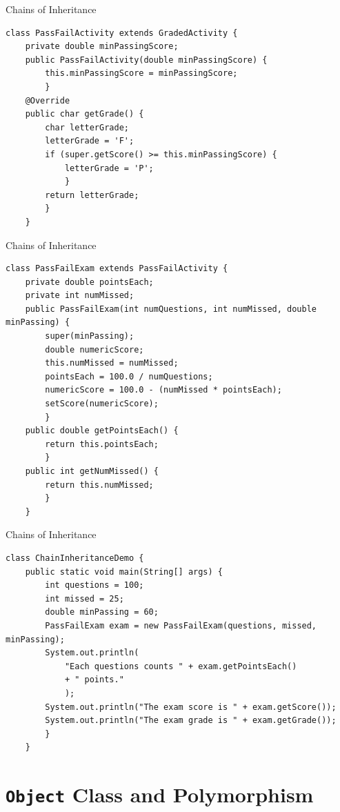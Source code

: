 \documentclass[11pt]{beamer}
\begin{document}
\begin{frame}[fragile]{Chains of Inheritance}
    \begin{lstlisting}[basicstyle=\ttfamily\footnotesize]
class PassFailActivity extends GradedActivity {
    private double minPassingScore;
    public PassFailActivity(double minPassingScore) {
        this.minPassingScore = minPassingScore;
        }
    @Override
    public char getGrade() {
        char letterGrade;
        letterGrade = 'F';
        if (super.getScore() >= this.minPassingScore) {
            letterGrade = 'P';
            }
        return letterGrade;
        }
    }
    \end{lstlisting}
\end{frame}

\begin{frame}[fragile]{Chains of Inheritance}
    \begin{lstlisting}[basicstyle=\ttfamily\footnotesize]
class PassFailExam extends PassFailActivity {
    private double pointsEach;
    private int numMissed;
    public PassFailExam(int numQuestions, int numMissed, double minPassing) {
        super(minPassing);
        double numericScore;
        this.numMissed = numMissed;
        pointsEach = 100.0 / numQuestions;
        numericScore = 100.0 - (numMissed * pointsEach);
        setScore(numericScore);
        }
    public double getPointsEach() {
        return this.pointsEach;
        }
    public int getNumMissed() {
        return this.numMissed;
        }
    }
    \end{lstlisting}
\end{frame}

\begin{frame}[fragile]{Chains of Inheritance}
    \begin{lstlisting}[basicstyle=\ttfamily\footnotesize]
class ChainInheritanceDemo {
    public static void main(String[] args) {
        int questions = 100;
        int missed = 25;
        double minPassing = 60;
        PassFailExam exam = new PassFailExam(questions, missed, minPassing);
        System.out.println(
            "Each questions counts " + exam.getPointsEach()
            + " points."
            );
        System.out.println("The exam score is " + exam.getScore());
        System.out.println("The exam grade is " + exam.getGrade());
        }
    }
    \end{lstlisting}
\end{frame}

\section{\texttt{Object} Class and Polymorphism}
\end{document}
